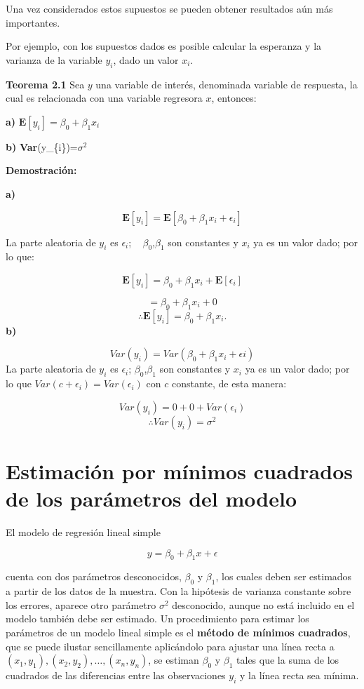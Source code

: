 \documentclass[a4paper,oneside,openany]{book}
\begin{document}
Una vez considerados estos supuestos se pueden obtener resultados aún
más importantes.

Por ejemplo, con los supuestos dados es posible calcular la esperanza y
la varianza de la variable \(y_{i}\), dado un valor \(x_{i}\).

\textbf{Teorema 2.1} Sea \(y\) una variable de interés, denominada
variable de respuesta, la cual es relacionada con una variable regresora
\(x\), entonces:

\textbf{a)} \(\mathbf{E}[y_{i}]=\beta_{0}+\beta_{1}x_{i}\)

\textbf{b)} \textbf{Var}(y\_\{i\})=\(\sigma^2\)

\textbf{Demostración:}

\textbf{a)}

\[\mathbf{E}[y_{i}]=\mathbf{E}[\beta_{0}+\beta_{1}x_{i}+\epsilon_{i}]\]

La parte aleatoria de \(y_{i}\) es \(\epsilon_{i}\); ~
\(\beta_{0}\),\(\beta_{1}\) son constantes y \(x_{i}\) ya es un valor
dado; por lo que:

\[\mathbf{E}[y_{i}]=\beta_{0}+\beta_{1}x_{i}+\mathbf{E}[\epsilon_{i}]\]

\[=\beta_{0}+\beta_{1}x_{i}+0\]
\[\therefore \mathbf{E}[y_{i}]=\beta_{0}+\beta_{1}x_{i}.\] \textbf{b)}

\[Var(y_{i})= Var(\beta_{0}+\beta_{1}x_{i}+\epsilon{i})\] La parte
aleatoria de \(y_{i}\) es \(\epsilon_{i}\); \(\beta_{0}\),\(\beta_{1}\)
son constantes y \(x_{i}\) ya es un valor dado; por lo que
\(Var(c+\epsilon_{i})=Var(\epsilon_{i})\) con \(c\) constante, de esta
manera:

\[Var(y_{i})=0+0+Var(\epsilon_{i})\] \[\therefore Var(y_{i})=\sigma^2\]

\section{Estimación por mínimos cuadrados de los parámetros del
modelo}\label{estimaciuxf3n-por-muxednimos-cuadrados-de-los-paruxe1metros-del-modelo}

El modelo de regresión lineal simple

\[y=\beta_{0}+\beta_{1}x+\epsilon\]

cuenta con dos parámetros desconocidos, \(\beta_{0}\) y \(\beta_{1}\),
los cuales deben ser estimados a partir de los datos de la muestra. Con
la hipótesis de varianza constante sobre los errores, aparece otro
parámetro \(\sigma^2\) desconocido, aunque no está incluido en el modelo
también debe ser estimado. Un procedimiento para estimar los parámetros
de un modelo lineal simple es el \textbf{método de mínimos cuadrados},
que se puede ilustar sencillamente aplicándolo para ajustar una línea
recta a \((x_{1},y_{1}),(x_{2},y_{2}),\ldots,(x_{n},y_{n})\), se estiman
\(\beta_{0}\) y \(\beta_{1}\) tales que la suma de los cuadrados de las
diferencias entre las observaciones \(y_{i}\) y la línea recta sea
mínima.
\end{document}
